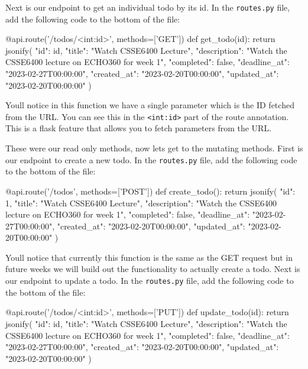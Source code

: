 \documentclass{csse4400}
\begin{document}
Next is our endpoint to get an individual todo by its id. In the \texttt{routes.py} file, add the following code to the bottom of the file:

\begin{code}[language=python]{}
@api.route('/todos/<int:id>', methods=['GET'])
def get_todo(id):
    return jsonify({
      "id": id,
      "title": "Watch CSSE6400 Lecture",
      "description": "Watch the CSSE6400 lecture on ECHO360 for week 1",
      "completed": false,
      "deadline_at": "2023-02-27T00:00:00",
      "created_at": "2023-02-20T00:00:00",
      "updated_at": "2023-02-20T00:00:00"
    })
\end{code}

Youll notice in this function we have a single parameter which is the ID fetched from the URL. You can see this in the \texttt{<int:id>} part of the route annotation. This is a flask feature that allows you to fetch parameters from the URL. 

These were our read only methods, now lets get to the mutating methods. First is our endpoint to create a new todo. In the \texttt{routes.py} file, add the following code to the bottom of the file:

\begin{code}[language=python]{}
@api.route('/todos', methods=['POST'])
def create_todo():
    return jsonify({
      "id": 1,
      "title": "Watch CSSE6400 Lecture",
      "description": "Watch the CSSE6400 lecture on ECHO360 for week 1",
      "completed": false,
      "deadline_at": "2023-02-27T00:00:00",
      "created_at": "2023-02-20T00:00:00",
      "updated_at": "2023-02-20T00:00:00"
    })
\end{code}

Youll notice that currently this function is the same as the GET request but in future weeks we will build out the functionality to actually create a todo. Next is our endpoint to update a todo. In the \texttt{routes.py} file, add the following code to the bottom of the file:

\begin{code}[language=python]{}
@api.route('/todos/<int:id>', methods=['PUT'])
def update_todo(id):
    return jsonify({
      "id": id,
      "title": "Watch CSSE6400 Lecture",
      "description": "Watch the CSSE6400 lecture on ECHO360 for week 1",
      "completed": false,
      "deadline_at": "2023-02-27T00:00:00",
      "created_at": "2023-02-20T00:00:00",
      "updated_at": "2023-02-20T00:00:00"
    })
\end{code}
\end{document}
